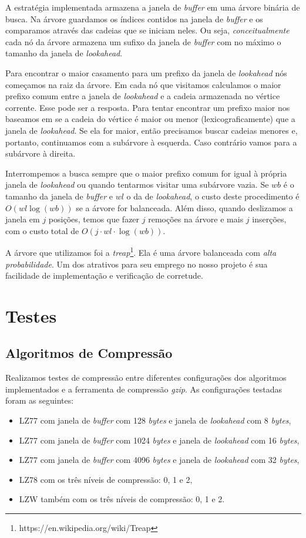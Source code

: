 \documentclass[]{article}
\begin{document}
A estratégia implementada armazena a janela de \textit{buffer} em uma árvore binária de busca. Na árvore guardamos os índices contidos na janela de \textit{buffer} e os comparamos através das cadeias que se iniciam neles. Ou seja, \textit{conceitualmente} cada nó da árvore armazena um sufixo da janela de \textit{buffer} com no máximo o tamanho da janela de \textit{lookahead}. 

Para encontrar o maior casamento para um prefixo da janela de \textit{lookahead} nós começamos na raiz da árvore. Em cada nó que visitamos calculamos o maior prefixo comum entre a janela de \textit{lookahead} e a cadeia armazenada no vértice corrente. Esse pode ser a resposta. Para tentar encontrar um prefixo maior nos baseamos em se a cadeia do vértice é maior ou menor (lexicograficamente) que a janela de \textit{lookahead}. Se ela for maior, então precisamos buscar cadeias menores e, portanto, continuamos com a subárvore à esquerda. Caso contrário vamos para a subárvore à direita.

Interrompemos a busca sempre que o maior prefixo comum for igual à própria janela de \textit{lookahead} ou quando tentarmos visitar uma subárvore vazia. Se $wb$ é o tamanho da janela de \textit{buffer} e $wl$ o da de \textit{lookahead}, o custo deste procedimento é $O(wl\log(wb))$ se a árvore for balanceada. Além disso, quando deslizamos a janela em $j$ posições, temos que fazer $j$ remoções na árvore e mais $j$ inserções, com o custo total de $O(j\cdot wl\cdot \log(wb))$.

A árvore que utilizamos foi a \textit{treap}\footnote{https://en.wikipedia.org/wiki/Treap}. Ela é uma árvore balanceada com \textit{alta probabilidade}. Um dos atrativos para seu emprego no nosso projeto é sua facilidade de implementação e verificação de corretude.

\section{Testes}

\subsection{Algoritmos de Compressão}


Realizamos testes de compressão entre diferentes configurações dos algoritmos implementados e a ferramenta de compressão \textit{gzip}. As configurações testadas foram as seguintes:
\begin{itemize}
	\item LZ77 com janela de \textit{buffer} com 128 \textit{bytes} e janela de \textit{lookahead} com 8 \textit{bytes},
	\item LZ77 com janela de \textit{buffer} com 1024 \textit{bytes} e janela de \textit{lookahead} com 16 \textit{bytes},
	\item LZ77 com janela de \textit{buffer} com 4096 \textit{bytes} e janela de \textit{lookahead} com 32 \textit{bytes},
	\item LZ78 com os três níveis de compressão: 0, 1 e 2, 
	\item LZW também com os três níveis de compressão: 0, 1 e 2.
\end{itemize}
\end{document}
